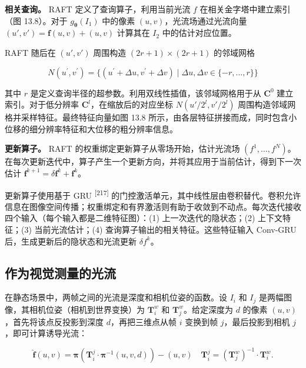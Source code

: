 \textbf{相关查询。} RAFT 定义了查询算子，利用当前光流 $f$ 在相关金字塔中建立索引（图 13.8）。对于 $g _ { \boldsymbol { \theta } } ( I _ { 1 } )$ 中的像素 $(u,v)$，光流场通过光流向量 $(u',v')=\mathbf f(u,v)+(u,v)$ 计算其在 $I _ { 2 }$ 中的估计对应位置。

RAFT 随后在 $(u',v')$ 周围构造 $(2r+1)\times(2r+1)$ 的邻域网格

\begin{equation}
N (u ^ { \prime}, v ^ { \prime}) = \{(u ^ { \prime} + \Delta u, v ^ { \prime} + \Delta v) \mid \Delta u, \Delta v \in \{- r,..., r \} \}\tag{13.5}
\end{equation}

其中 $r$ 是定义查询半径的超参数。利用双线性插值，该邻域网格用于从 $\mathbf C^0$ 建立索引。对于低分辨率 $\mathbf C^l$，在缩放后的对应坐标 $N(u'/2^l,v'/2^l)$ 周围构造邻域网格并采样特征。最终特征向量如图 13.8 所示，由各层特征拼接而成，同时包含小位移的细分辨率特征和大位移的粗分辨率信息。

\textbf{更新算子。} RAFT 的权重绑定更新算子从零场开始，估计光流场 $(f^1,\ldots,f^N)$。在每次更新迭代中，算子产生一个更新方向，并将其应用于当前估计，得到下一次估计 $\pmb f^{k+1}=\delta\pmb f^k+\pmb f^k$。

更新算子使用基于 GRU \textsuperscript{[217]} 的门控激活单元，其中线性层由卷积替代。卷积允许信息在图像空间传播；权重绑定和有界激活则有助于收敛到不动点。每次迭代接收四个输入（每个输入都是二维特征图）：(1) 上一次迭代的隐状态；(2) 上下文特征；(3) 当前光流估计；(4) 查询算子输出的相关特征。这些特征输入 Conv-GRU 后，生成更新后的隐状态和光流更新 $\delta f^k$。

\subsection{作为视觉测量的光流}

在静态场景中，两帧之间的光流是深度和相机位姿的函数。设 $I_i$ 和 $I_j$ 是两幅图像，其相机位姿（相机到世界变换）为 $\pmb T_i^w$ 和 $\pmb T_j^w$。给定深度为 $d$ 的像素 $(u,v)$，首先将该点反投影到深度 $d$，再把三维点从帧 $i$ 变换到帧 $j$，最后投影到相机 $j$，即可计算诱导光流：

\begin{equation}
\hat {\boldsymbol {f}} (u, v) = \boldsymbol {\pi} \left(\boldsymbol {T} _ {i} ^ {j} \cdot \boldsymbol {\pi} ^ {- 1} (u, v, d)\right) - (u, v) \quad \boldsymbol {T} _ {i} ^ {j} = (\boldsymbol {T} _ {j} ^ {w}) ^ {- 1} \cdot \boldsymbol {T} _ {i} ^ {w}.\tag{13.6}
\end{equation}

